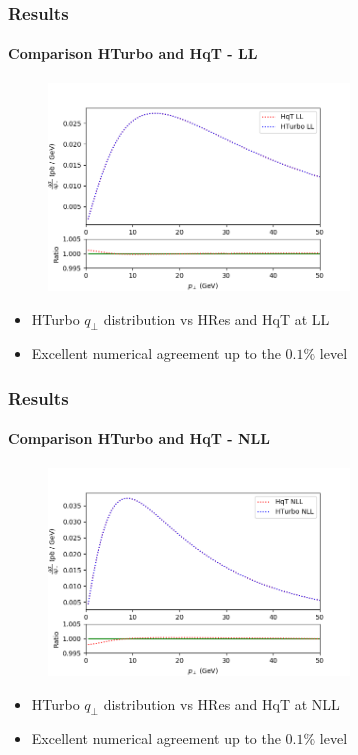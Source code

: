 \documentclass[aspectratio=43]{beamer}
\begin{document}
\begin{frame}
	
	\frametitle{Results}
	\framesubtitle{Comparison HTurbo and HqT - LL}
	
	\begin{figure}
		\includegraphics[width = 8cm]{plots/part_III/hturbo_LL.png}
	\end{figure}
	
	\begin{itemize}
		\item HTurbo $q_{\perp}$ distribution vs HRes and HqT at LL
		\item Excellent numerical agreement up to the $0.1\%$ level
	\end{itemize}

\end{frame}

\begin{frame}

	\frametitle{Results}
	\framesubtitle{Comparison HTurbo and HqT - NLL}
	
	\begin{figure}
		\includegraphics[width = 8cm]{plots/part_III/hturbo_NLL.png}
	\end{figure}
	
	\begin{itemize}
		\item HTurbo $q_{\perp}$ distribution vs HRes and HqT at NLL
		\item Excellent numerical agreement up to the $0.1\%$ level
	\end{itemize}

\end{frame}
\end{document}
